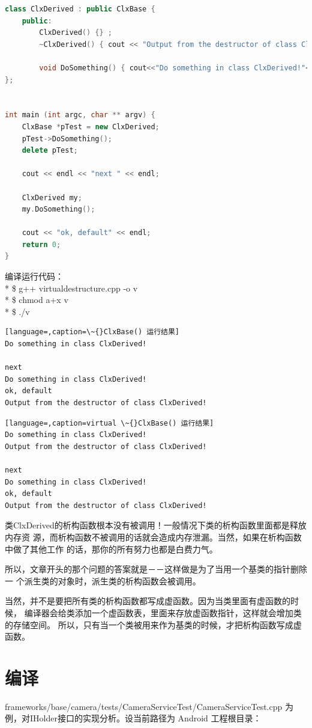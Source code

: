 \documentclass[a4paper,11pt]{article}
\begin{document}
\begin{appendices}
\begin{lstlisting}[language=c++, caption=VirtualDestructor.cpp]
class ClxDerived : public ClxBase {
    public:
        ClxDerived() {} ;
        ~ClxDerived() { cout << "Output from the destructor of class ClxDerived!" << endl; } ;

        void DoSomething() { cout<<"Do something in class ClxDerived!"<<endl;};
};


int main (int argc, char ** argv) {
    ClxBase *pTest = new ClxDerived;
    pTest->DoSomething();
    delete pTest;

    cout << endl << "next " << endl;

    ClxDerived my;
    my.DoSomething();

    cout << "ok, default" << endl;
    return 0;
}
\end{lstlisting}

编译运行代码：\\*
\$ g++ virtualdestructure.cpp -o v\\*
\$ chmod a+x v\\*
\$ ./v

\begin{lstlisting}[language=,caption=\~{}ClxBase() 运行结果]
Do something in class ClxDerived!

next
Do something in class ClxDerived!
ok, default
Output from the destructor of class ClxDerived!
\end{lstlisting}

\begin{lstlisting}[language=,caption=virtual \~{}ClxBase() 运行结果]
Do something in class ClxDerived!
Output from the destructor of class ClxDerived!

next
Do something in class ClxDerived!
ok, default
Output from the destructor of class ClxDerived!
\end{lstlisting}

类ClxDerived的析构函数根本没有被调用！一般情况下类的析构函数里面都是释放内存资
源，而析构函数不被调用的话就会造成内存泄漏。当然，如果在析构函数中做了其他工作
的话，那你的所有努力也都是白费力气。

所以，文章开头的那个问题的答案就是－－这样做是为了当用一个基类的指针删除一
个派生类的对象时，派生类的析构函数会被调用。

当然，并不是要把所有类的析构函数都写成虚函数。因为当类里面有虚函数的时候，
编译器会给类添加一个虚函数表，里面来存放虚函数指针，这样就会增加类的存储空间。
所以，只有当一个类被用来作为基类的时候，才把析构函数写成虚函数。

\iffalse
\section{编译}\label{compile}
frameworks/base/camera/tests/CameraServiceTest/CameraServiceTest.cpp
为例，对IHolder接口的实现分析。设当前路径为 Android 工程根目录：


\end{appendices}
\end{document}
